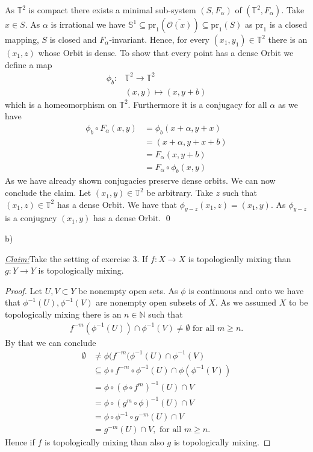 \documentclass{article}
\newcommand{\claim}{\underline{\textit{Claim:}}\hspace{0,2cm}}
\newcommand{\N}{\mathbb{N}}
\renewcommand{\S}[1]{\mathbb{S}^{#1}}
\newcommand{\T}[1]{\mathbb{T}^{#1}}
\renewcommand{\O}{\mathcal{O}}
\newcommand{\pr}{\mathrm{pr}}
\theoremstyle{definition}
\theoremstyle{plain}
\theoremstyle{remark}
\newcommand{\teilaufgabe}[1]{
	{
\noindent 
\vspace*{0.2cm}
\hspace*{0,1 cm}
\textsf{#1)}
}
}
\begin{document}
As $\T2$ is compact there exists a minimal sub-system $(S,F_{\alpha})$ of $(\T2,F_{\alpha})$. Take $x\in S$. As $\alpha$ is irrational we have $\S1\subseteq \pr_1(\overline{\O(x)})\subseteq \pr_1(S)$ as $\pr_1$ is a closed mapping, $S$ is closed and $F_{\alpha}$-invariant. Hence, for every $(x_1,y_1)\in \T2$ there is an $(x_1,z)$ whose Orbit is dense. 
To show that every point has a dense Orbit we define a map
\begin{align}
	\phi_b : &\T2 \rightarrow \T2 \\
	       &(x,y)\mapsto (x,y+b)
\end{align}
which is a homeomorphism on $\T2$. Furthermore it is a conjugacy for all $\alpha$ as we have
\begin{align}
	\phi_b \circ F_{\alpha} (x,y) &= \phi_b (x+\alpha, y +x ) \\
				    &= (x+\alpha, y+x+b) \\
				    &=F_{\alpha}(x,y+b) \\
				    &=F_{\alpha} \circ \phi_b (x,y)
\end{align}
As we have already shown conjugacies preserve dense orbits. We can now conclude the claim. Let $(x_1,y) \in \T2$ be arbitrary. Take $z$ such that $(x_1,z)\in \T2$ has a dense Orbit. We have that $\phi_{y-z}(x_1,z) = (x_1,y)$. As $\phi_{y-z}$ is a conjugacy $(x_1,y)$ has a dense Orbit.
\qed \medskip

\teilaufgabe{b}
\claim Take the setting of exercise 3. If $f:X\rightarrow X$ is topologically mixing than $g:Y\rightarrow Y$ is topologically mixing.
\begin{proof}
	Let $U,V\subset Y$ be nonempty open sets. As $\phi$ is continuous and onto we have that $\phi^{-1}(U),\phi^{-1}(V)$ are nonempty open subsets of $X$. As we assumed $X$ to be topologically mixing there is an $n\in \N$ such that 
	\begin{align}
		f^{-m}(\phi^{-1}(U))\cap \phi^{-1}(V) \neq \emptyset \text{ for all } m\geq n.
	\end{align}
	By that we can conclude
	\begin{align}
		\emptyset &\neq \phi(f^{-m}(\phi^{-1}(U)\cap\phi^{-1}(V) \\
			  &\subseteq \phi\circ f^{-m}\circ \phi^{-1}(U)\cap \phi(\phi^{-1}(V)) \\
			  &= \phi\circ (\phi\circ f^m)^{-1}(U) \cap V \\
			  &= \phi \circ (g^m \circ \phi)^{-1}(U)\cap V \\
			  &= \phi \circ \phi^{-1}\circ g^{-m}(U)\cap V \\
			  &= g^{-m}(U) \cap V,
		\text{ for all } m\geq n.
	\end{align}
	Hence if $f$ is topologically mixing than also $g$ is topologically mixing.
\end{proof}
\end{document}
